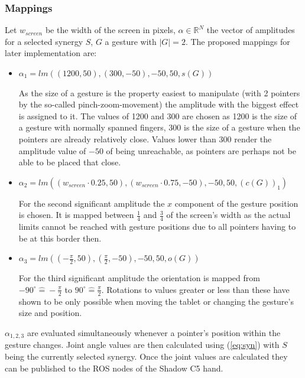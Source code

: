 \subsubsection{Mappings}

Let $w_{screen}$ be the width of the screen in pixels, $\alpha \in \mathbb{R}^N$ the vector of amplitudes for a selected synergy $S$, $G$ a gesture with $|G| = 2$. The proposed mappings for later implementation are:
\begin{itemize}
	\item $\alpha_1 = lm\left((1200, 50), (300, -50), -50, 50, s(G)\right)$
	
	As the size of a gesture is the property easiest to manipulate (with 2 pointers by the so-called pinch-zoom-movement) the amplitude with the biggest effect is assigned to it. The values of 1200 and 300 are chosen as 1200 is the size of a gesture with normally spanned fingers, 300 is the size of a gesture when the pointers are already relatively close. Values lower than 300 render the amplitude value of $-50$ of being unreachable, as pointers are perhaps not be able to be placed that close.
	
	\item $\alpha_2 = lm\left((w_{screen} \cdot 0.25, 50), (w_{screen} \cdot 0.75, -50), -50, 50, (c(G))_1\right)$
	
	For the second significant amplitude the $x$ component of the gesture position is chosen. It is mapped between $\frac{1}{4}$ and $\frac{3}{4}$ of the screen's width as the actual limits cannot be reached with gesture positions due to all pointers having to be at this border then.
	
	\item $\alpha_3 = lm\left( \left( -\frac{\pi}{2}, 50 \right), \left( \frac{\pi}{2}, -50 \right), -50, 50, o(G) \right)$
	
	For the third significant amplitude the orientation is mapped from $-90^\circ \widehat{=} -\frac{\pi}{2}$ to $90^\circ \widehat{=} \frac{\pi}{2}$. Rotations to values greater or less than these have shown to be only possible when moving the tablet or changing the gesture's size and position.
\end{itemize}

$\alpha_{1,2,3}$ are evaluated simultaneously whenever a pointer's position within the gesture changes. Joint angle values are then calculated using (\ref{eq:syn}) with $S$ being the currently selected synergy. Once the joint values are calculated they can be published to the ROS nodes of the Shadow C5 hand.

